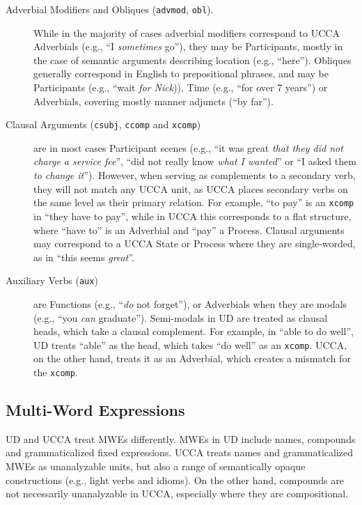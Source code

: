 \documentclass[11pt,a4paper]{article}
\begin{document}
\begin{description}
    \item[Adverbial Modifiers and Obliques (\texttt{advmod}, \texttt{obl}).]
    While in the majority of cases
    adverbial modifiers correspond to UCCA Adverbials (e.g., ``I \textit{sometimes} go''),
    they may be Participants, mostly in the case of semantic arguments describing location (e.g., ``here'').
    Obliques generally correspond in English to prepositional phrases, and may be
    Participants (e.g., ``wait \textit{for Nick})), Time (e.g., ``for over 7 years'') 
    or Adverbials, covering mostly manner adjuncts (``by far'').

    \item[Clausal Arguments (\texttt{csubj}, \texttt{ccomp} and \texttt{xcomp})] 
    are in most cases Participant scenes
    (e.g., ``it was great \textit{that they did not charge a service fee}'',
    ``did not really know \textit{what I wanted}'' or
    ``I asked them \textit{to change it}'').
    However, when serving as complements to a secondary verb, they
    will not match any UCCA unit, as UCCA places secondary verbs on the 
    same level as their primary relation. 
    For example, ``to pay'' is an \texttt{xcomp} in ``they have to pay'', while in UCCA
    this corresponds to a flat structure, where ``have to'' is an Adverbial and ``pay'' a Process.
    Clausal arguments may correspond to a UCCA State or Process where
    they are single-worded, as in ``this seems \textit{great}''.

    \item[Auxiliary Verbs (\texttt{aux})] are Functions (e.g., ``\textit{do} not forget''),
    or Adverbials when they are modals (e.g., ``you \textit{can} graduate''). Semi-modals 
    in UD are treated as clausal heads, which take a clausal complement. 
    For example, in ``able to do well'', UD treats ``able'' as the head,
    which takes ``do well'' as an \texttt{xcomp}. UCCA, on the other hand,
    treats it as an Adverbial, which creates a mismatch for the \texttt{xcomp}.
    
\end{description}    
    

\subsection{Multi-Word Expressions}\label{sec:mwe}

UD and UCCA treat MWEs differently.
MWEs in UD include names, compounds and grammaticalized fixed expressions.
UCCA treats names and grammaticalized MWEs as unanalyzable units,
but also a range of semantically opaque constructions
(e.g., light verbs and idioms).
On the other hand, compounds are not necessarily unanalyzable in UCCA,
especially where they are compositional.
\end{document}
